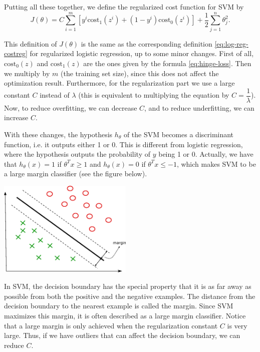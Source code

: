 \documentclass[a4paper,11pt]{report}
\begin{document}
Putting all these together, we define the regularized cost function for SVM by
\begin{equation}\label{eq:svm-cost}
J(\theta) = C\displaystyle\sum_{i=1}^m \left[y^{i}\text{cost}_1(z^{i}) + (1 - y^{i})\text{cost}_0(z^{i})\right] + \dfrac{1}{2}\sum_{j=1}^n \theta^2_j.
\end{equation}

This definition of $J(\theta)$ is the same as the corresponding definition \ref{eq:log-reg-costreg} for regularized logistic regression, up to some minor changes. First of all, $\text{cost}_0(z)$ and $\text{cost}_1(z)$ are the ones given by the formula \ref{eq:hinge-loss}. Then we multiply by $m$ (the training set size), since this does not affect the optimization result. Furthermore, for the regularization part we use a large constant $C$ instead of $\lambda$ (this is equivalent to multiplying the equation by $C = \dfrac{1}{\lambda}$). Now, to reduce overfitting, we can decrease $C$, and to reduce underfitting, we can increase $C$.

With these changes, the hypothesis $h_\theta$ of the SVM becomes a discriminant function, i.e. it outputs either 1 or 0. This is different from logistic regression, where the hypothesis outputs the probability of $y$ being 1 or 0. Actually, we have that $h_\theta(x) = 1$ if $\theta^Tx \ge 1$ and $h_\theta(x) = 0$ if $\theta^Tx \le -1$, which makes SVM to be a large margin classifier (see the figure below).

\hspace{1.0in}
\begin{center}
\includegraphics[height = 1.8in]{ml_images/svm}
\end{center}

In SVM, the decision boundary has the special property that it is as far away as possible from both the positive and the negative examples. The distance from the decision boundary to the nearest example is called the margin. Since SVM maximizes this margin, it is often described as a large margin classifier. Notice that a large margin is only achieved when the regularization constant $C$ is very large. Thus, if we have outliers that can affect the decision boundary, we can reduce $C$.
\end{document}
